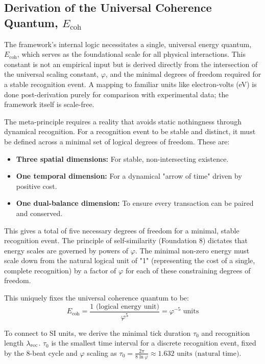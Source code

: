 \subsection{Derivation of the Universal Coherence Quantum, \texorpdfstring{$E_{\text{coh}}$}{E_coh}}
The framework's internal logic necessitates a single, universal energy quantum, \(E_{\text{coh}}\), which serves as the foundational scale for all physical interactions. This constant is not an empirical input but is derived directly from the intersection of the universal scaling constant, \(\varphi\), and the minimal degrees of freedom required for a stable recognition event. A mapping to familiar units like electron-volts (eV) is done post-derivation purely for comparison with experimental data; the framework itself is scale-free.

The meta-principle requires a reality that avoids static nothingness through dynamical recognition. For a recognition event to be stable and distinct, it must be defined across a minimal set of logical degrees of freedom. These are:
\begin{itemize}
    \item \textbf{Three spatial dimensions:} For stable, non-intersecting existence.
    \item \textbf{One temporal dimension:} For a dynamical "arrow of time" driven by positive cost.
    \item \textbf{One dual-balance dimension:} To ensure every transaction can be paired and conserved.
\end{itemize}
This gives a total of five necessary degrees of freedom for a minimal, stable recognition event. The principle of self-similarity (Foundation 8) dictates that energy scales are governed by powers of \(\varphi\). The minimal non-zero energy must scale down from the natural logical unit of "1" (representing the cost of a single, complete recognition) by a factor of \(\varphi\) for each of these constraining degrees of freedom.

This uniquely fixes the universal coherence quantum to be:
\begin{equation}
E_{\text{coh}} = \frac{1 \text{ (logical energy unit)}}{\varphi^5} = \varphi^{-5} \text{ units}
\end{equation}

To connect to SI units, we derive the minimal tick duration \(\tau_0\) and recognition length \(\lambda_{\text{rec}}\). \(\tau_0\) is the smallest time interval for a discrete recognition event, fixed by the 8-beat cycle and \(\varphi\) scaling as \(\tau_0 = \frac{2\pi}{8 \ln \varphi} \approx 1.632 \text{ units (natural time)}\).

